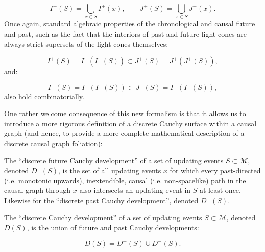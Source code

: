 \documentclass{article}
\begin{document}
\begin{equation}
I^{\pm} \left( S \right) = \bigcup_{x \in S} I^{\pm} \left( x \right), \qquad J^{\pm} \left( S \right) = \bigcup_{x \in S} J^{\pm} \left( x \right).
\end{equation}
Once again, standard algebraic properties of the chronological and causal future and past, such as the fact that the interiors of past and future light cones are always strict supersets of the light cones themselves:

\begin{equation}
I^{+} \left( S \right) = I^{+} \left( I^{+} \left( S \right) \right) \subset J^{+} \left( S \right) = J^{+} \left( J^{+} \left( S \right) \right),
\end{equation}
and:

\begin{equation}
I^{-} \left( S \right) = I^{-} \left( I^{-} \left( S \right) \right) \subset J^{-} \left( S \right) = I^{-} \left( I^{-} \left( S \right) \right),
\end{equation}
also hold combinatorially.

One rather welcome consequence of this new formalism is that it allows us to introduce a more rigorous definition of a discrete Cauchy surface within a causal graph (and hence, to provide a more complete mathematical description of a discrete causal graph foliation):

\begin{definition}
The ``discrete future Cauchy development'' of a set of updating events ${S \subset \mathcal{M}}$, denoted ${D^{+} \left( S \right)}$, is the set of all updating events $x$ for which every past-directed (i.e. monotonic upwards), inextendible, causal (i.e. non-spacelike) path in the causal graph through $x$ also intersects an updating event in $S$ at least once. Likewise for the ``discrete past Cauchy development'', denoted ${D^{-} \left( S \right)}$.
\end{definition}

\begin{definition}
The ``discrete Cauchy development'' of a set of updating events ${S \subset \mathcal{M}}$, denoted ${D \left( S \right)}$, is the union of future and past Cauchy developments:

\begin{equation}
D \left( S \right) = D^{+} \left( S \right) \cup D^{-} \left( S \right).
\end{equation}
\end{definition}
\end{document}
